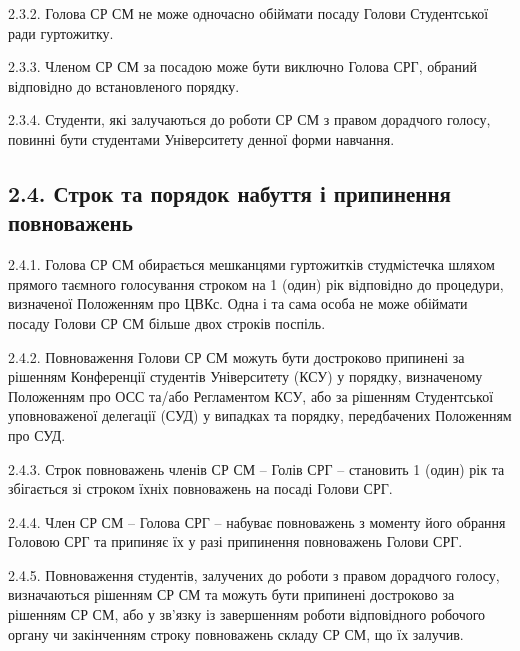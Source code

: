     2.3.2. Голова СР СМ не може одночасно обіймати посаду Голови Студентської ради гуртожитку.

    2.3.3. Членом СР СМ за посадою може бути виключно Голова СРГ, обраний відповідно до встановленого порядку.

    2.3.4. Студенти, які залучаються до роботи СР СМ з правом дорадчого голосу, повинні бути студентами Університету денної форми навчання.

\subsection*{2.4. Строк та порядок набуття і припинення повноважень}
    2.4.1. Голова СР СМ обирається мешканцями гуртожитків студмістечка шляхом прямого таємного голосування строком на 1 (один) рік відповідно до процедури, визначеної Положенням про ЦВКс. Одна і та сама особа не може обіймати посаду Голови СР СМ більше двох строків поспіль.

    2.4.2. Повноваження Голови СР СМ можуть бути достроково припинені за рішенням Конференції студентів Університету (КСУ) у порядку, визначеному Положенням про ОСС та/або Регламентом КСУ, або за рішенням Студентської уповноваженої делегації (СУД) у випадках та порядку, передбачених Положенням про СУД.

    2.4.3. Строк повноважень членів СР СМ – Голів СРГ – становить 1 (один) рік та збігається зі строком їхніх повноважень на посаді Голови СРГ.

    2.4.4. Член СР СМ – Голова СРГ – набуває повноважень з моменту його обрання Головою СРГ та припиняє їх у разі припинення повноважень Голови СРГ.

    2.4.5. Повноваження студентів, залучених до роботи з правом дорадчого голосу, визначаються рішенням СР СМ та можуть бути припинені достроково за рішенням СР СМ, або у зв'язку із завершенням роботи відповідного робочого органу чи закінченням строку повноважень складу СР СМ, що їх залучив.
